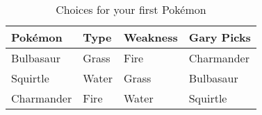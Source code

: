 \begin{table}[ht]
\centering
\begin{tabular}{llll}
  \toprule
Pok\'emon & Type & Weakness & Gary Picks \\ 
  \midrule
Bulbasaur & Grass & Fire & Charmander \\ 
  Squirtle & Water & Grass & Bulbasaur \\ 
  Charmander & Fire & Water & Squirtle \\ 
   \bottomrule
\end{tabular}
\caption{Choices for your first Pok\'emon} 
\label{tab:first-pm}
\end{table}

